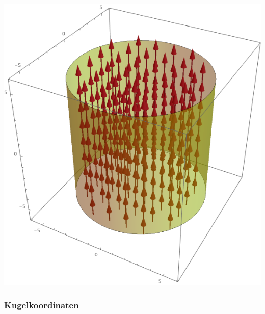 \begin{center}

		\includegraphics[scale=0.3]{zylindric_z.png}

\end{center}
\iend



\newpage

	\subsubsection{Kugelkoordinaten}


